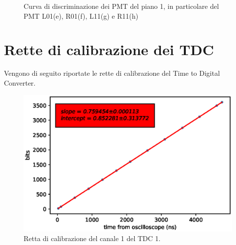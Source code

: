 \begin{figure}[H]
\begin{minipage}{.5\textwidth}
		\end{minipage}%
		\begin{minipage}{.5\textwidth}
			\centering
			\quad
		\end{minipage}
		\caption{Curva di discriminazione dei PMT del piano 1, in particolare del PMT L01(e), R01(f), L11(g) e R11(h)}
\end{figure}
\chapter{Rette di calibrazione dei TDC}               %
Vengono di seguito riportate le rette di calibrazione del Time to Digital Converter.

\begin{figure}[H]
  \centering
  \includegraphics[width=.8\textwidth]{plots/tdc11.eps}
  \caption{Retta di calibrazione del canale 1 del TDC 1.}
  \label{fig:tdc11}
\end{figure}

